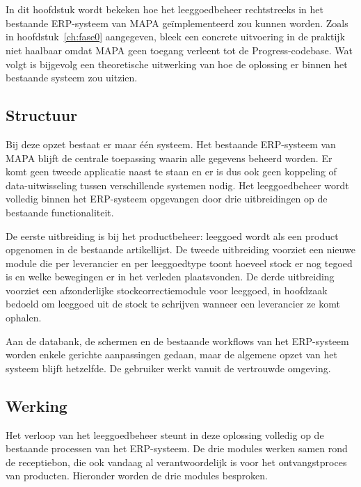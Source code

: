\chapter{}
\label{ch:fase1}

In dit hoofdstuk wordt bekeken hoe het leeggoedbeheer rechtstreeks in het bestaande ERP-systeem van MAPA geïmplementeerd zou kunnen worden. Zoals in hoofdstuk~\ref{ch:fase0} aangegeven, bleek een concrete uitvoering in de praktijk niet haalbaar omdat MAPA geen toegang verleent tot de Progress-codebase. Wat volgt is bijgevolg een theoretische uitwerking van hoe de oplossing er binnen het bestaande systeem zou uitzien.

\section{Structuur}

Bij deze opzet bestaat er maar één systeem. Het bestaande ERP-systeem van MAPA blijft de centrale toepassing waarin alle gegevens beheerd worden. Er komt geen tweede applicatie naast te staan en er is dus ook geen koppeling of data-uitwisseling tussen verschillende systemen nodig. Het leeggoedbeheer wordt volledig binnen het ERP-systeem opgevangen door drie uitbreidingen op de bestaande functionaliteit.

De eerste uitbreiding is bij het productbeheer: leeggoed wordt als een product opgenomen in de bestaande artikellijst. De tweede uitbreiding voorziet een nieuwe module die per leverancier en per leeggoedtype toont hoeveel stock er nog tegoed is en welke bewegingen er in het verleden plaatsvonden. De derde uitbreiding voorziet een afzonderlijke stockcorrectiemodule voor leeggoed, in hoofdzaak bedoeld om leeggoed uit de stock te schrijven wanneer een leverancier ze komt ophalen.

Aan de databank, de schermen en de bestaande workflows van het ERP-systeem worden enkele gerichte aanpassingen gedaan, maar de algemene opzet van het systeem blijft hetzelfde. De gebruiker werkt vanuit de vertrouwde omgeving.

\section{Werking}

Het verloop van het leeggoedbeheer steunt in deze oplossing volledig op de bestaande processen van het ERP-systeem. De drie modules werken samen rond de receptiebon, die ook vandaag al verantwoordelijk is voor het ontvangstproces van producten. Hieronder worden de drie modules besproken.

